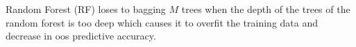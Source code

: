 \documentclass[12pt]{article}
\begin{document}
\begin{enumerate}

\begin{tcolorbox}[colback=white, sharp corners]
Random Forest (RF) loses to bagging $M$ trees when the depth of the trees of the random forest is too deep which causes it to overfit the training data and decrease in oos predictive accuracy. 
\end{tcolorbox}

\end{enumerate}

\newpage
\end{document}
